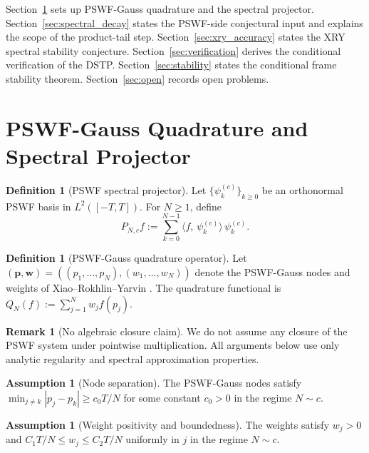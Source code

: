 \documentclass[12pt,a4paper]{amsart}
\theoremstyle{definition}
\newtheorem{definition}[theorem]{Definition}
\newtheorem{remark}[theorem]{Remark}
\newtheorem{assumption}[theorem]{Assumption}
\newcommand{\ip}[2]{\langle #1,\, #2\rangle}
\newcommand{\PN}{P_{N,c}}
\begin{document}
Section~\ref{sec:pswf_gauss} sets up PSWF-Gauss quadrature and the
spectral projector. Section~\ref{sec:spectral_decay} states the PSWF-side
conjectural input and explains the scope of the product-tail step.
Section~\ref{sec:xry_accuracy} states the XRY spectral stability conjecture.
Section~\ref{sec:verification} derives the conditional verification of
the DSTP. Section~\ref{sec:stability} states the conditional frame
stability theorem. Section~\ref{sec:open} records open problems.

\section{PSWF-Gauss Quadrature and Spectral Projector}\label{sec:pswf_gauss}

\begin{definition}[PSWF spectral projector]\label{def:projector}
Let $\{\psi_k^{(c)}\}_{k\ge0}$ be an orthonormal PSWF basis in
$L^2([-T,T])$. For $N\ge1$, define
\[
  \PN f := \sum_{k=0}^{N-1}\ip{f}{\psi_k^{(c)}}\,\psi_k^{(c)}.
\]
\end{definition}

\begin{definition}[PSWF-Gauss quadrature operator]\label{def:xry}
Let $(\mathbf{p},\mathbf{w})=((p_1,\dots,p_N),(w_1,\dots,w_N))$ denote
the PSWF-Gauss nodes and weights of Xiao--Rokhlin--Yarvin \cite{Xiao2001}.
The quadrature functional is $Q_N(f):=\sum_{j=1}^N w_j f(p_j)$.
\end{definition}

\begin{remark}[No algebraic closure claim]\label{rem:no_algebra}
We do not assume any closure of the PSWF system under pointwise
multiplication. All arguments below use only analytic regularity and
spectral approximation properties.
\end{remark}

\begin{assumption}[Node separation]\label{ass:node_sep}
The PSWF-Gauss nodes satisfy
$\min_{j\ne k}|p_j-p_k|\ge c_0 T/N$
for some constant $c_0>0$ in the regime $N\sim c$.
\end{assumption}

\begin{assumption}[Weight positivity and boundedness]\label{ass:weights}
The weights satisfy $w_j>0$ and $C_1 T/N\le w_j\le C_2 T/N$
uniformly in $j$ in the regime $N\sim c$.
\end{assumption}
\end{document}
